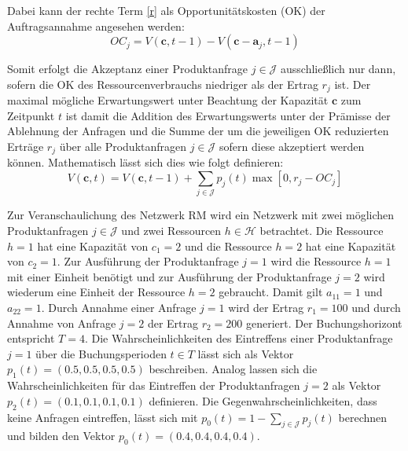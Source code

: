 Dabei kann der rechte Term \eqref{r} als Opportunitätskosten (OK) der Auftragsannahme angesehen werden:
\begin{equation}\label{OC}
OC_{j} = V(\textbf{c},t-1)-V(\textbf{c}-\textbf{a}_{j},t-1)
\end{equation}

Somit erfolgt die Akzeptanz einer Produktanfrage $j\in\mathcal{J}$ ausschließlich nur dann, sofern die OK des Ressourcenverbrauchs niedriger als der Ertrag $r_j$ ist. Der maximal mögliche Erwartungswert unter Beachtung der Kapazität $\textbf{c}$ zum Zeitpunkt $t$ ist damit die Addition des Erwartungswerts unter der Prämisse der Ablehnung der Anfragen und die Summe der um die jeweiligen OK reduzierten Erträge $r_j$ über alle Produktanfragen $j\in\mathcal{J}$ sofern diese akzeptiert werden können. Mathematisch lässt sich dies wie folgt definieren:
\begin{equation}\label{DPoc}
V(\textbf{c},t)=V(\textbf{c},t-1) + \sum_{j\in\mathcal{J}}p_{j}(t) \max[0,r_{j}-OC_{j}]
\end{equation}



Zur Veranschaulichung des Netzwerk RM wird ein Netzwerk mit zwei möglichen Produktanfragen $j\in\mathcal{J}$ und zwei Ressourcen $h\in\mathcal{H}$ betrachtet. Die Ressource $h=1$ hat eine Kapazität von $c_{1}=2$ und die Ressource $h=2$ hat eine Kapazität von $c_{2}=1$. Zur Ausführung der Produktanfrage $j=1$ wird die Ressource $h=1$ mit einer Einheit benötigt und zur Ausführung der Produktanfrage $j=2$ wird wiederum eine Einheit der Ressource $h=2$ gebraucht. Damit gilt $a_{11}=1$ und $a_{22}=1$. Durch Annahme einer Anfrage $j=1$ wird der Ertrag $r_{1}=100$ und durch Annahme von Anfrage $j=2$ der Ertrag $r_{2}=200$ generiert. Der Buchungshorizont entspricht $T=4$. Die Wahrscheinlichkeiten des Eintreffens einer Produktanfrage $j=1$ über die Buchungsperioden $t\in T$ lässt sich als Vektor $p_{1}(t)=(0.5, 0.5, 0.5, 0.5)$ beschreiben. Analog lassen sich die Wahrscheinlichkeiten für das Eintreffen der Produktanfragen $j=2$ als Vektor $p_{2}(t)=(0.1, 0.1, 0.1, 0.1)$ definieren. Die Gegenwahrscheinlichkeiten, dass keine Anfragen eintreffen, lässt sich mit $p_{0}(t)=1-\sum_{j\in \mathcal{J}}p_{j}(t)$ berechnen und bilden den Vektor $p_{0}(t)=(0.4, 0.4, 0.4, 0.4)$.

